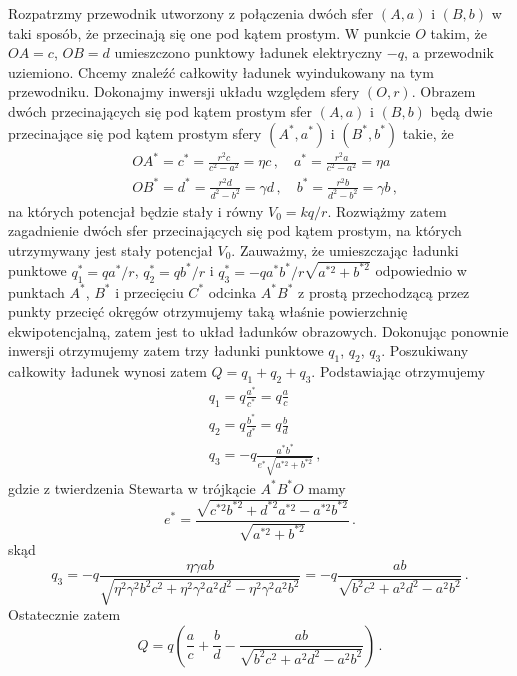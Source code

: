 \documentclass[../main.tex]{subfiles}
\begin{document}
\begin{enumerate}
    Rozpatrzmy przewodnik utworzony z połączenia dwóch sfer \((A,a)\) i \((B,b)\) w taki sposób, że
    przecinają się one pod kątem prostym. W punkcie \(O\) takim, że \(OA=c\), \(OB=d\) umieszczono
    punktowy ładunek elektryczny \(-q\), a przewodnik uziemiono. Chcemy znaleźć całkowity ładunek
    wyindukowany na tym przewodniku. Dokonajmy inwersji układu względem sfery \((O,r)\). Obrazem
    dwóch przecinających się pod kątem prostym sfer \((A,a)\) i \((B,b)\) będą dwie przecinające się
    pod kątem prostym sfery \((A^*,a^*)\) i \((B^*,b^*)\) takie, że
    \begin{equation*}
    \begin{split}
        &OA^*=c^*=\frac{r^2c}{c^2-a^2}=\eta c\,,\quad a^*=\frac{r^2a}{c^2-a^2}=\eta a\\
        &OB^*=d^*=\frac{r^2d}{d^2-b^2}=\gamma d\,,\quad b^*=\frac{r^2b}{d^2-b^2}=\gamma b\,,
    \end{split}
    \end{equation*}
    na których potencjał będzie stały i równy \(V_0=kq/r\). Rozwiążmy zatem zagadnienie dwóch sfer
    przecinających się pod kątem prostym, na których utrzymywany jest stały potencjał \(V_0\).
    Zauważmy, że umieszczając ładunki punktowe \(q_1^*=qa^*/r\), \(q_2^*=qb^*/r\) i
    \(q_3^*=-qa^*b^*/r\sqrt{a^{*2}+b^{*2}}\) odpowiednio w punktach \(A^*\), \(B^*\) i przecięciu
    \(C^*\) odcinka \(A^*B^*\) z prostą przechodzącą przez punkty przecięć okręgów otrzymujemy taką
    właśnie powierzchnię ekwipotencjalną, zatem jest to układ ładunków obrazowych. Dokonując
    ponownie inwersji otrzymujemy zatem trzy ładunki punktowe \(q_1\), \(q_2\), \(q_3\). Poszukiwany
    całkowity ładunek wynosi zatem \(Q=q_1+q_2+q_3\). Podstawiając otrzymujemy
    \begin{equation*}
    \begin{split}
        &q_1=q\frac{a^*}{c^*}=q\frac{a}{c}\\
        &q_2=q\frac{b^*}{d^*}=q\frac{b}{d}\\
        &q_3=-q\frac{a^*b^*}{e^*\sqrt{a^{*2}+b^{*2}}}\,,
    \end{split}
    \end{equation*}
    gdzie z twierdzenia Stewarta w trójkącie \(A^*B^*O\) mamy
    \begin{equation*}
        e^*=\frac{\sqrt{c^{*2}b^{*2}+d^{*2}a^{*2}-a^{*2}b^{*2}}}{\sqrt{a^{*2}+b^{*2}}}\,.
    \end{equation*}
     skąd
    \begin{equation*}
        q_3=-q\frac{\eta\gamma ab}{\sqrt{\eta^2\gamma^2b^2c^2+\eta^2\gamma^2a^2d^2-\eta^2\gamma^2a^2b^2}}=-q\frac{ab}{\sqrt{b^2c^2+a^2d^2-a^2b^2}}\,.
    \end{equation*}
    Ostatecznie zatem
    \begin{equation*}
        Q=q\left(\frac{a}{c}+\frac{b}{d}-\frac{ab}{\sqrt{b^2c^2+a^2d^2-a^2b^2}}\right)\,.
    \end{equation*}


\end{enumerate}
\end{document}
